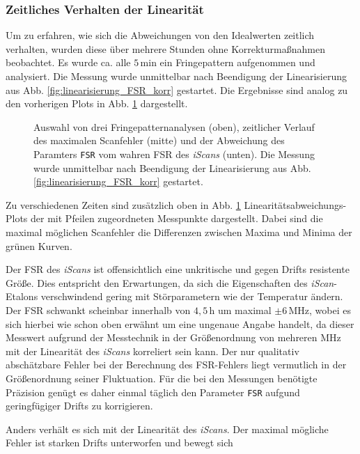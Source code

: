\subsubsection{Zeitliches Verhalten
der Linearität}\label{subsubsec:linearitaet_verlauf}
Um zu erfahren, wie
sich die Abweichungen von den Idealwerten zeitlich verhalten, wurden diese über
mehrere Stunden ohne Korrekturmaßnahmen beobachtet. Es wurde ca. alle $5\,$min ein Fringepattern aufgenommen und analysiert. Die Messung wurde unmittelbar nach Beendigung der Linearisierung aus Abb.
\ref{fig:linearisierung_FSR_korr} gestartet.
Die Ergebnisse sind analog zu den vorherigen Plots in Abb.
\ref{fig:linearitaet_verlauf} dargestellt.
\begin{figure}
	 	\centering
	 	\footnotesize
		
		\caption[Linearitaet \textit{iScan}, zeitlicher Verlauf]{Auswahl von drei
		Fringepatternanalysen (oben), zeitlicher Verlauf des maximalen Scanfehler
		(mitte) und der Abweichung des Paramters \lstinline|FSR| vom wahren FSR des
		\textit{iScans} (unten). Die Messung wurde unmittelbar nach Beendigung der
		Linearisierung aus Abb. \ref{fig:linearisierung_FSR_korr} gestartet.}
		\label{fig:linearitaet_verlauf}
\end{figure}
Zu verschiedenen Zeiten sind zusätzlich oben in Abb.
\ref{fig:linearitaet_verlauf} Linearitätsabweichungs-Plots der mit Pfeilen
zugeordneten Messpunkte dargestellt. Dabei sind die maximal möglichen Scanfehler
die Differenzen zwischen Maxima und Minima der grünen Kurven.\par
Der FSR des
\textit{iScans} ist offensichtlich eine unkritische und gegen Drifts
resistente Größe. Dies entspricht den Erwartungen, da sich die Eigenschaften des
\textit{iScan}-Etalons verschwindend gering mit Störparametern wie der
Temperatur ändern. Der FSR schwankt scheinbar innerhalb von $4,5\,$h um maximal
$\pm6\,$MHz, wobei es sich hierbei wie schon oben erwähnt um eine ungenaue
Angabe handelt, da dieser Messwert aufgrund der Messtechnik in der Größenordnung von mehreren MHz mit der Linearität des \textit{iScans} korreliert sein kann. Der nur qualitativ abschätzbare Fehler bei der Berechnung des FSR-Fehlers liegt vermutlich in der Größenordnung seiner
Fluktuation. Für die bei den Messungen benötigte Präzision genügt es daher
einmal täglich den Parameter \lstinline|FSR| aufgund geringfügiger Drifts zu korrigieren.\par
Anders verhält es sich mit der Linearität des \textit{iScans}.
Der maximal mögliche Fehler ist starken Drifts unterworfen und bewegt sich
